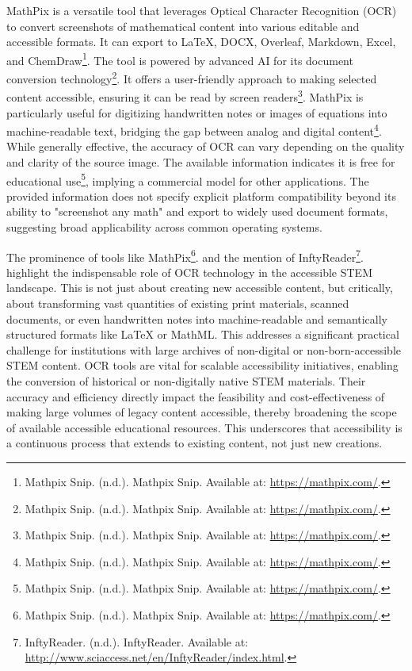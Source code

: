 MathPix is a versatile tool that leverages Optical Character Recognition (OCR) to convert screenshots of mathematical content into various editable and accessible formats. It can export to LaTeX, DOCX, Overleaf, Markdown, Excel, and ChemDraw\footnote{Mathpix Snip. (n.d.). Mathpix Snip. Available at: \url{https://mathpix.com/}.}. The tool is powered by advanced AI for its document conversion technology\footnote{Mathpix Snip. (n.d.). Mathpix Snip. Available at: \url{https://mathpix.com/}.}. It offers a user-friendly approach to making selected content accessible, ensuring it can be read by screen readers\footnote{Mathpix Snip. (n.d.). Mathpix Snip. Available at: \url{https://mathpix.com/}.}. MathPix is particularly useful for digitizing handwritten notes or images of equations into machine-readable text, bridging the gap between analog and digital content\footnote{Mathpix Snip. (n.d.). Mathpix Snip. Available at: \url{https://mathpix.com/}.}. While generally effective, the accuracy of OCR can vary depending on the quality and clarity of the source image. The available information indicates it is free for educational use\footnote{Mathpix Snip. (n.d.). Mathpix Snip. Available at: \url{https://mathpix.com/}.}, implying a commercial model for other applications. The provided information does not specify explicit platform compatibility beyond its ability to "screenshot any math" and export to widely used document formats, suggesting broad applicability across common operating systems.

The prominence of tools like MathPix\footnote{Mathpix Snip. (n.d.). Mathpix Snip. Available at: \url{https://mathpix.com/}.}. and the mention of InftyReader\footnote{InftyReader. (n.d.). InftyReader. Available at: \url{http://www.sciaccess.net/en/InftyReader/index.html}.}. highlight the indispensable role of OCR technology in the accessible STEM landscape. This is not just about creating new accessible content, but critically, about transforming vast quantities of existing print materials, scanned documents, or even handwritten notes into machine-readable and semantically structured formats like LaTeX or MathML. This addresses a significant practical challenge for institutions with large archives of non-digital or non-born-accessible STEM content. OCR tools are vital for scalable accessibility initiatives, enabling the conversion of historical or non-digitally native STEM materials. Their accuracy and efficiency directly impact the feasibility and cost-effectiveness of making large volumes of legacy content accessible, thereby broadening the scope of available accessible educational resources. This underscores that accessibility is a continuous process that extends to existing content, not just new creations.

